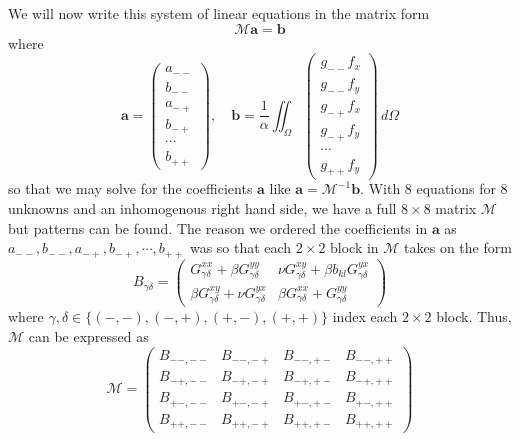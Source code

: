 \documentclass[11pt]{article}
\begin{document}
We will now write this system of linear equations in the matrix form
\begin{equation}
\mathcal{M}\bm{a} = \bm{b}
\end{equation}
where
\begin{equation}
  \bm{a} =
    \begin{pmatrix}
      a_{--} \\
      b_{--} \\
      a_{-+} \\
      b_{-+} \\
      \cdots \\
      b_{++}
    \end{pmatrix}
  , \quad
  \bm{b} = \frac{1}{\alpha} \iint_\Omega
    \begin{pmatrix}
      g_{--}f_x \\
      g_{--}f_y \\
      g_{-+}f_x \\
      g_{-+}f_y \\
      \cdots \\
      g_{++}f_y
    \end{pmatrix}  
  \, d\Omega
\end{equation}
so that we may solve for the coefficients $\bm{a}$ like $\bm{a} = \mathcal{M}^{-1}\bm{b}$. With 8 equations for 8 unknowns and an inhomogenous right hand side, we have a full $8\times8$ matrix $\mathcal{M}$ but patterns can be found. The reason we ordered the coefficients in $\bm{a}$ as $a_{--}, b_{--}, a_{-+}, b_{-+}, \cdots, b_{++}$ was so that each $2\times2$ block in $\mathcal{M}$ takes on the form
\begin{equation}
  B_{\gamma\delta} =
  \begin{pmatrix}
    G_{\gamma\delta}^{xx} + \beta G_{\gamma\delta}^{yy}
      & \nu G_{\gamma\delta}^{xy} + \beta b_{kl} G_{\gamma\delta}^{yx} \\
    \beta G_{\gamma\delta}^{xy} + \nu G_{\gamma\delta}^{yx}
      & \beta G_{\gamma\delta}^{xx} + G_{\gamma\delta}^{yy}
    \end{pmatrix}
\end{equation}
where $\gamma,\delta \in \{(-,-), (-,+), (+,-), (+,+) \}$ index each $2\times2$ block. Thus, $\mathcal{M}$ can be expressed as
\begin{equation}
  \mathcal{M} =
  \begin{pmatrix}
    B_{--,--} & B_{--,-+} & B_{--,+-} & B_{--,++} \\
    B_{-+,--} & B_{-+,-+} & B_{-+,+-} & B_{-+,++} \\
    B_{+-,--} & B_{+-,-+} & B_{+-,+-} & B_{+-,++} \\
    B_{++,--} & B_{++,-+} & B_{++,+-} & B_{++,++}
  \end{pmatrix}
\end{equation}
\end{document}
